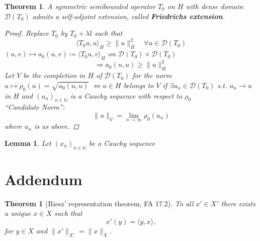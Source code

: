 \documentclass[12pt]{extreport} %
\newcommand{\N}{\mathbb{N}}
\newcommand{\DO}[1]{\mathcal{D}\left( {#1} \right)}
\theoremstyle{named}
\theoremstyle{nnamed}
\theoremstyle{itshape}
\newtheorem{theorem}{Theorem}  \counterwithin{theorem}{chapter}
\newtheorem{lemma}{Lemma}  \counterwithin{lemma}{chapter}
\theoremstyle{normal}
\newtheorem*{theorem*}{Theorem}
\begin{document}
\begin{theorem}
	A symmetric semibounded operator $T_0$ on $H$ with dense domain $\DO{T_0}$ admits a self-adjoint extension, called \textbf{Friedrichs extension}.
	
	\begin{proof}
		Replace $T_0$ by $T_0 + \lambda \mathbb{I}$ such that
		$$ \langle T_0 u, u \rangle_H \geq \|u\|_H^2 \quad \forall u \in \DO{T_0} $$
		$(u,v) \mapsto a_0(u,v) \coloneqq \langle T_0 u, v \rangle_H$ on $\DO{T_0} \times \DO{T_0}$
		$$ \Rightarrow a_0(u,u) \geq \| u \|^2_H $$
		Let $V$ be the completion in $H$ of $\DO{T_0}$ for the norm $u \mapsto \rho_0(u) = \sqrt{a_0(u,u)}$
		$\iff u \in H$ belongs to $V$ if $\exists u_n \in \DO{T_0}$ s.t. $u_n \rightarrow u$ in $H $ and $ (u_n)_{n \in \N}$ is a Cauchy sequence with respect to $\rho_0$ ~\\
		
		\enquote{Candidate Norm}:
		$$ \| u \|_V = \lim_{n \rightarrow \infty} \rho_0(u_n) $$
		where $u_n$ is as above.
	\end{proof}
\end{theorem}

\begin{lemma}
	Let $(x_n)_{n \in \N}$ be a Cauchy sequence
\end{lemma}

\appendix

\chapter*{Addendum}

\begin{theorem*}[Riesz' representation theorem, FA 17.2]
	To all $x' \in X'$ there exists a unique $x \in X$ such that
	$$ x'(y) = \langle y, x \rangle,  $$
	for $y \in X$ and $\|x'\|_{X'} = \|x\|_X$.
\end{theorem*}



\renewcommand{\indexname}{Stichwortverzeichnis}
\printindex
\end{document}
